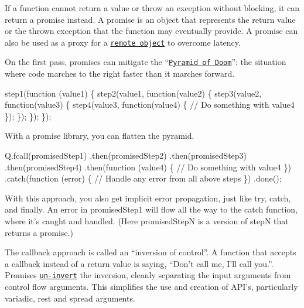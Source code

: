 \href{http://travis-ci.org/kriskowal/q}{\tt } \href{https://cdnjs.com/libraries/q.js}{\tt }

\href{http://promises-aplus.github.com/promises-spec}{\tt }

If a function cannot return a value or throw an exception without blocking, it can return a promise instead. A promise is an object that represents the return value or the thrown exception that the function may eventually provide. A promise can also be used as a proxy for a \href{https://github.com/kriskowal/q-connection}{\tt remote object} to overcome latency.

On the first pass, promises can mitigate the “\href{http://calculist.org/blog/2011/12/14/why-coroutines-wont-work-on-the-web/}{\tt Pyramid of Doom}”\+: the situation where code marches to the right faster than it marches forward.


\begin{DoxyCode}
step1(function (value1) \{
    step2(value1, function(value2) \{
        step3(value2, function(value3) \{
            step4(value3, function(value4) \{
                // Do something with value4
            \});
        \});
    \});
\});
\end{DoxyCode}


With a promise library, you can flatten the pyramid.


\begin{DoxyCode}
Q.fcall(promisedStep1)
.then(promisedStep2)
.then(promisedStep3)
.then(promisedStep4)
.then(function (value4) \{
    // Do something with value4
\})
.catch(function (error) \{
    // Handle any error from all above steps
\})
.done();
\end{DoxyCode}


With this approach, you also get implicit error propagation, just like {\ttfamily try}, {\ttfamily catch}, and {\ttfamily finally}. An error in {\ttfamily promised\+Step1} will flow all the way to the {\ttfamily catch} function, where it’s caught and handled. (Here {\ttfamily promised\+StepN} is a version of {\ttfamily stepN} that returns a promise.)

The callback approach is called an “inversion of control”. A function that accepts a callback instead of a return value is saying, “\+Don’t call me, I’ll call you.\+”. Promises \href{http://www.slideshare.net/domenicdenicola/callbacks-promises-and-coroutines-oh-my-the-evolution-of-asynchronicity-in-javascript}{\tt un-\/invert} the inversion, cleanly separating the input arguments from control flow arguments. This simplifies the use and creation of A\+P\+I’s, particularly variadic, rest and spread arguments.

